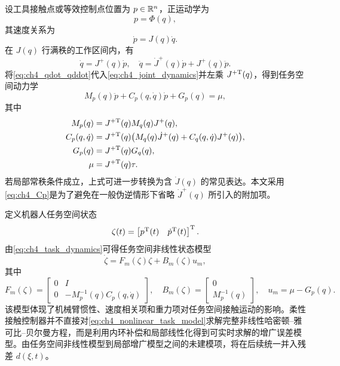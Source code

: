 设工具接触点或等效控制点位置为 $p\in\mathbb{R}^n$，正运动学为
\begin{equation}
  p=\Phi(q),
  \label{eq:ch4_forward_kinematics}
\end{equation}
其速度关系为
\begin{equation}
  \dot p=J(q)\dot q .
  \label{eq:ch4_task_velocity}
\end{equation}
在 $J(q)$ 行满秩的工作区间内，有
\begin{equation}
  \dot q=J^+(q)\dot p,
  \quad
  \ddot q=\dot J^+(q)\dot p+J^+(q)\ddot p .
  \label{eq:ch4_qdot_qddot}
\end{equation}
将\eqref{eq:ch4_qdot_qddot}代入\eqref{eq:ch4_joint_dynamics}并左乘 $J^{+\mathrm{T}}(q)$，得到任务空间动力学
\begin{equation}
  M_p(q)\ddot p+C_p(q,\dot q)\dot p+G_p(q)=\mu,
  \label{eq:ch4_task_dynamics}
\end{equation}
其中
\begin{align}
  M_p(q)&=J^{+\mathrm{T}}(q)M_q(q)J^+(q),
  \label{eq:ch4_Mp}\\
  C_p(q,\dot q)&=J^{+\mathrm{T}}(q)\bigl(M_q(q)\dot J^+(q)+C_q(q,\dot q)J^+(q)\bigr),
  \label{eq:ch4_Cp}\\
  G_p(q)&=J^{+\mathrm{T}}(q)G_q(q),
  \label{eq:ch4_Gp}\\
  \mu&=J^{+\mathrm{T}}(q)\tau.
  \label{eq:ch4_mu}
\end{align}
若局部常秩条件成立，上式可进一步转换为含 $\dot J(q)$ 的常见表达。本文采用\eqref{eq:ch4_Cp}是为了避免在一般伪逆情形下省略 $\dot J^+(q)$ 所引入的附加项。

定义机器人任务空间状态
\begin{equation}
  \zeta(t)=\begin{bmatrix}p^{\mathrm{T}}(t)&\dot p^{\mathrm{T}}(t)\end{bmatrix}^{\mathrm{T}} .
  \label{eq:ch4_zeta_state}
\end{equation}
由\eqref{eq:ch4_task_dynamics}可得任务空间非线性状态模型
\begin{equation}
  \dot\zeta=F_m(\zeta)\zeta+B_m(\zeta)u_m,
  \label{eq:ch4_nonlinear_task_model}
\end{equation}
其中
\begin{equation}
  F_m(\zeta)=
  \begin{bmatrix}
    0&I\\
    0&-M_p^{-1}(q)C_p(q,\dot q)
  \end{bmatrix},
  \quad
  B_m(\zeta)=
  \begin{bmatrix}
    0\\
    M_p^{-1}(q)
  \end{bmatrix},
  \quad
  u_m=\mu-G_p(q).
  \label{eq:ch4_Fm_Bm}
\end{equation}
该模型体现了机械臂惯性、速度相关项和重力项对任务空间接触运动的影响。柔性接触控制器并不直接对\eqref{eq:ch4_nonlinear_task_model}求解完整非线性哈密顿--雅可比--贝尔曼方程，而是利用内环补偿和局部线性化得到可实时求解的增广误差模型。由任务空间非线性模型到局部增广模型之间的未建模项，将在后续统一并入残差 $d(\xi,t)$。


